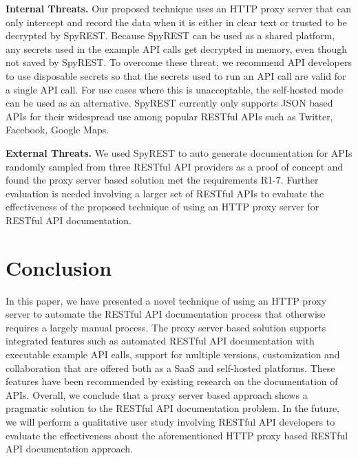\textbf{Internal Threats.} Our proposed technique uses an HTTP proxy server that can only intercept and record the data when it is either in clear text or trusted to be decrypted by SpyREST. Because SpyREST can be used as a shared platform, any secrets used in the example API calls get decrypted in memory, even though not saved by SpyREST. To overcome these threat, we recommend API developers to use disposable secrets so that the secrets used to run an API call are valid for a single API call. For use cases where this is unacceptable, the self-hosted mode can be used as an alternative. SpyREST currently only supports JSON based APIs for their widespread use among popular RESTful APIs such as Twitter, Facebook, Google Maps.

\textbf{External Threats.} We used SpyREST to auto generate documentation for APIs randomly sampled from three RESTful API providers as a proof of concept and found the proxy server based solution met the requirements R1-7. Further evaluation is needed involving a larger set of RESTful APIs to evaluate the effectiveness of the proposed technique of using an HTTP proxy server for RESTful API documentation.

\section{Conclusion}
In this paper, we have presented a novel technique of using an HTTP proxy server to automate the RESTful API documentation process that otherwise requires a largely manual process. The proxy server based solution supports integrated features such as automated RESTful API documentation with executable example API calls, support for multiple versions, customization and collaboration that are offered both as a SaaS and self-hosted platforms. These features have been recommended by existing research on the documentation of APIs. Overall, we conclude that a proxy server based approach shows a pragmatic solution to the RESTful API documentation problem. In the future, we will perform a qualitative user study involving RESTful API developers to evaluate the effectiveness about the aforementioned HTTP proxy based RESTful API documentation approach.



